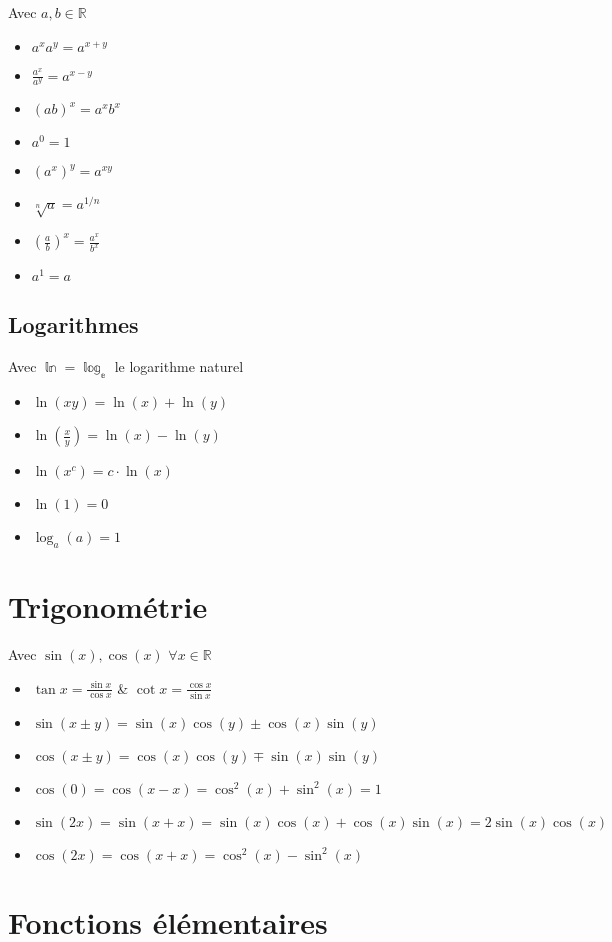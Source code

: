 \documentclass[10pt,a4paper]{book}
\newcommand{\R}{\mathbb{R}}
\begin{document}
Avec $a,b \in \R$
\begin{itemize}
\item $a^xa^y = a^{x+y}$
\item $\frac{a^x}{a^y} = a^{x-y}$
\item $(ab)^x = a^xb^x$
\item $a^0 = 1$
\item $(a^x)^y = a^{xy}$
\item $\sqrt[n]{a} = a^{1/n}$
\item $\left(\frac{a}{b}\right)^x = \frac{a^x}{b^x}$
\item $a^1 = a$
\end{itemize}

\subsection{Logarithmes}

Avec $\mathbb{\ln = \log_e}$ le logarithme naturel
\begin{itemize}
\item $\ln(xy) = \ln(x) + \ln(y)$
\item $\ln(\frac{x}{y}) = \ln(x) - \ln(y)$
\item $\ln(x^c) = c\cdot \ln(x)$
\item $\ln(1) = 0$
\item $\log_a(a) = 1$
\end{itemize}

\section{Trigonométrie}

Avec $\sin(x), \cos(x)$  $\forall x \in \R$
\begin{itemize}
\item $\tan x = \frac{\sin x}{\cos x}$ \& $\cot x = \frac{\cos x}{\sin x}$
\item $\sin(x\pm y) = \sin(x)\cos(y) \pm \cos(x)\sin(y)$
\item $\cos(x \pm y) = \cos(x)\cos(y) \mp \sin(x)\sin(y)$
\item $\cos(0) = \cos(x-x) = \cos^2(x) + \sin^2(x) = 1$
\item $\sin(2x) = \sin(x+x) = \sin(x)\cos(x) + \cos(x)\sin(x) = 2\sin(x)\cos(x)$
\item $\cos(2x) = \cos(x+x) = \cos^2(x) - \sin^2(x)$
\end{itemize}

\section{Fonctions élémentaires}
\end{document}
